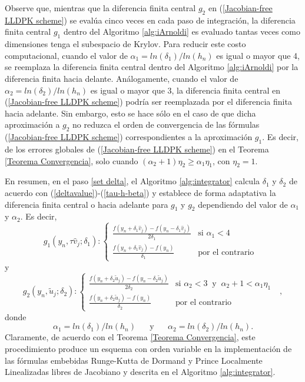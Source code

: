 Observe que, mientras que la diferencia finita central $g_2$ en (\ref{Jacobian-free LLDPK scheme}) se evalúa cinco veces en cada paso de integración, la diferencia finita central $g_1$ dentro del Algoritmo \ref{alg:iArnoldi} es evaluado tantas veces como dimensiones tenga el subespacio de Krylov. Para reducir este costo computacional, cuando el valor de $\alpha_1=ln(\delta_1)/ln(h_n)$ es igual o mayor que 4, se reemplaza la diferencia finita central dentro del Algoritmo \ref{alg:iArnoldi} por la diferencia finita hacia delante. Análogamente, cuando el valor de $\alpha_2=ln(\delta_2)/ln(h_n)$ es igual o mayor que 3, la diferencia finita central en (\ref{Jacobian-free LLDPK scheme}) podría ser reemplazada por el diferencia finita hacia adelante. Sin embargo, esto se hace sólo en el caso de que dicha aproximación a $g_2$ no reduzca el orden de convergencia de las fórmulas (\ref{Jacobian-free LLDPK scheme}) correspondientes a la aproximación $g_1$. Es decir, de los errores globales de (\ref{Jacobian-free LLDPK scheme}) en el Teorema \ref{Teorema Convergencia}, solo cuando $(\alpha_2+1)\eta_2 \ge \alpha_1\eta_1$, con $\eta_2=1$.

En resumen, en el paso \ref{set delta}, el Algoritmo \ref{alg:integrator} calcula $\delta_1$ y $\delta_2$ de acuerdo con (\ref{deltavalue})-(\ref{tau-h-beta}) y establece de forma adaptativa la diferencia finita central o hacia adelante para $g_1$ y $g_2$ dependiendo del valor de $\alpha_1$ y $\alpha_2$. Es decir,
\begin{equation} \label{g1}
	g_{1}(y_{n},\tau \widehat{v}_{j};\delta _{1}) : \left\{
	\begin{array}{cc}
	\frac{f(y_{n}+\delta _{1}\widehat{v}_{j})-f(y_{n}-\delta _{1}\widehat{v}_{j})%
	}{2\delta _{1}} & \text{si }\alpha _{1}<4 \\
	\frac{f(y_{n}+\delta _{1}\widehat{v}_{j})-f(y_{n})}{\delta _{1}} & \text{por el contrario}%
	\end{array}
	\text{ }\right.
\end{equation}
y
\begin{equation}  \label{g2}
	g_{2}(y_{n},\widetilde{u}_{j};\delta _{2}) : \left\{
	\begin{array}{cc}
	\frac{f(y_{n}+\delta _{2}\widetilde{u}_{j})-f(y_{n}-\delta _{2}\widetilde{u}%
		_{j})}{2\delta _{2}} & \text{si }\alpha _{2}<3 \;\;\text{y}\;\; \alpha_2+1 < \alpha_1\eta_1 \\
	\frac{f(y_{n}+\delta _{2}\widetilde{u}_{j})-f(y_{n})}{\delta _{2}} &
    \text{por el contrario}%
	\end{array}%
	\text{ }\right. ,
\end{equation}
donde
\begin{equation} \label{alpha_formulas}
    \alpha_1=ln(\delta_1)/ln(h_n) \;\;\;\;\;\; \text{y} \;\;\;\;\;\; \alpha_2=ln(\delta_2)/ln(h_n).
\end{equation}
Claramente, de acuerdo con el Teorema \ref{Teorema Convergencia}, este procedimiento produce un esquema con orden variable en la implementación de las fórmulas embebidas Runge-Kutta de Dormand y Prince Localmente Linealizadas libres de Jacobiano y descrita en el Algoritmo \ref{alg:integrator}.

